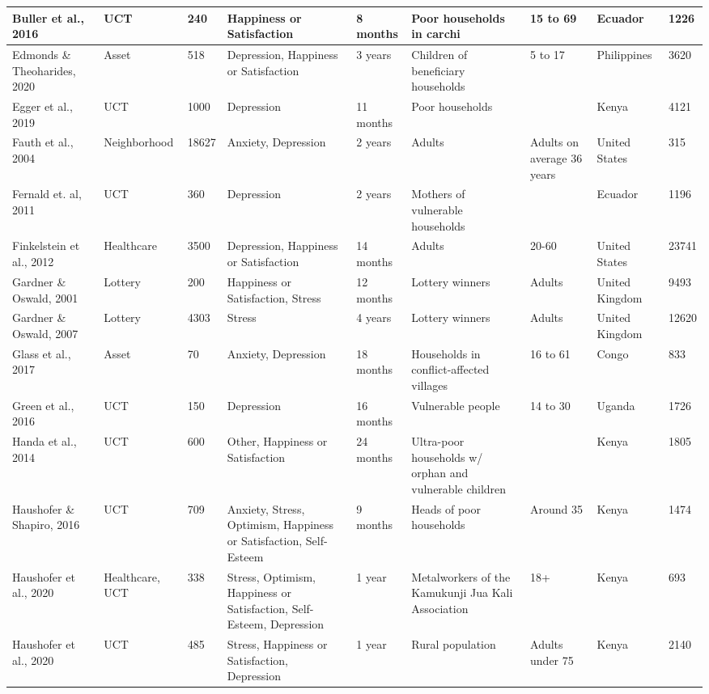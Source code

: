 \begin{longtable}{p{1.8cm}p{1.7cm}p{1.3 cm}p{1.8cm}p{1.7cm}p{1.8cm}p{1cm}p{1.2cm}p{1cm}}
   \hline
Buller et al., 2016 & UCT & 240 & Happiness or Satisfaction & 8 months & Poor households in carchi & 15 to 69 & Ecuador & 1226 \\ 
   \hline
Edmonds \& Theoharides, 2020 & Asset & 518 & Depression, Happiness or Satisfaction & 3 years & Children of beneficiary households & 5 to 17 & Philippines & 3620 \\ 
   \hline
Egger et al., 2019 & UCT & 1000 & Depression & 11 months & Poor households &  & Kenya & 4121 \\ 
   \hline
Fauth et al., 2004 & Neighborhood & 18627 & Anxiety, Depression & 2 years & Adults & Adults on average 36 years & United States & 315 \\ 
   \hline
Fernald et. al, 2011 & UCT & 360 & Depression & 2 years & Mothers of vulnerable households &  & Ecuador & 1196 \\ 
   \hline
Finkelstein et al., 2012 & Healthcare & 3500 & Depression, Happiness or Satisfaction & 14 months & Adults & 20-60 & United States & 23741 \\ 
   \hline
Gardner \& Oswald, 2001 & Lottery & 200 & Happiness or Satisfaction, Stress & 12 months & Lottery winners & Adults & United Kingdom & 9493 \\ 
   \hline
Gardner \& Oswald, 2007 & Lottery & 4303 & Stress & 4 years & Lottery winners & Adults & United Kingdom & 12620 \\ 
   \hline
Glass et al., 2017 & Asset & 70 & Anxiety, Depression & 18 months & Households in conflict-affected villages & 16 to 61 & Congo & 833 \\ 
   \hline
Green et al., 2016 & UCT & 150 & Depression & 16 months & Vulnerable people & 14 to 30 & Uganda & 1726 \\ 
   \hline
Handa et al., 2014 & UCT & 600 & Other, Happiness or Satisfaction & 24 months & Ultra-poor households w/ orphan and vulnerable children &  & Kenya & 1805 \\ 
   \hline
Haushofer \& Shapiro, 2016 & UCT & 709 & Anxiety, Stress, Optimism, Happiness or Satisfaction, Self-Esteem & 9 months & Heads of poor households & Around 35 & Kenya & 1474 \\ 
   \hline
Haushofer et al., 2020 & Healthcare, UCT & 338 & Stress, Optimism, Happiness or Satisfaction, Self-Esteem, Depression & 1 year & Metalworkers of the Kamukunji Jua Kali Association & 18+ & Kenya & 693 \\ 
   \hline
Haushofer et al., 2020 & UCT & 485 & Stress, Happiness or Satisfaction, Depression & 1 year & Rural population & Adults under 75 & Kenya & 2140 \\ 

\end{longtable}
